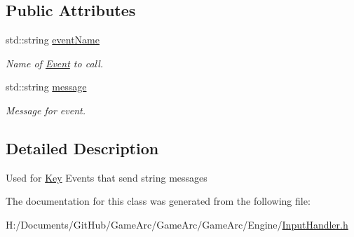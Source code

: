 \subsection*{Public Attributes}
\begin{DoxyCompactItemize}
\item 
\hypertarget{class_key_input_event_aaea5ec49ffe2e60d40401473e2ed16c6}{std\+::string \hyperlink{class_key_input_event_aaea5ec49ffe2e60d40401473e2ed16c6}{event\+Name}}\label{class_key_input_event_aaea5ec49ffe2e60d40401473e2ed16c6}

\begin{DoxyCompactList}\small\item\em Name of \hyperlink{class_event}{Event} to call. \end{DoxyCompactList}\item 
\hypertarget{class_key_input_event_aa84df12c9e4630625f4ad926eabe1cc9}{std\+::string \hyperlink{class_key_input_event_aa84df12c9e4630625f4ad926eabe1cc9}{message}}\label{class_key_input_event_aa84df12c9e4630625f4ad926eabe1cc9}

\begin{DoxyCompactList}\small\item\em Message for event. \end{DoxyCompactList}\end{DoxyCompactItemize}


\subsection{Detailed Description}
Used for \hyperlink{class_key}{Key} Events that send string messages 

The documentation for this class was generated from the following file\+:\begin{DoxyCompactItemize}
\item 
H\+:/\+Documents/\+Git\+Hub/\+Game\+Arc/\+Game\+Arc/\+Game\+Arc/\+Engine/\hyperlink{_input_handler_8h}{Input\+Handler.\+h}\end{DoxyCompactItemize}
